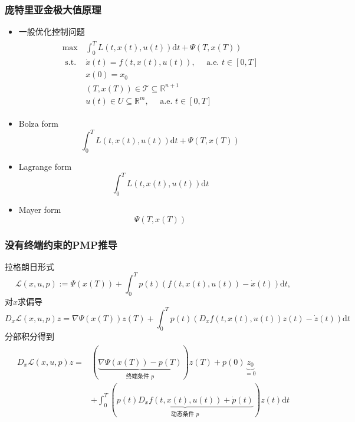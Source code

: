 \documentclass[UTF8, aspectratio=169, 9pt]{ctexbeamer}
\begin{document}
\begin{frame}
  \frametitle{庞特里亚金极大值原理}
  \begin{itemize}
    \item 一般优化控制问题
    \begin{align}
      \begin{split}
\max  \, & \int_{0}^{T} L(t, x(t), u(t)) \mathrm{d} t+\Psi(T, x(T)) \\
 \text { s.t. } & \dot{x}(t)=f(t, x(t), u(t)), \quad \text { a.e. } t \in[0, T] \\
& x(0)=x_{0} \\
& (T, x(T)) \in \mathcal{T} \subseteq \mathbb{R}^{n+1} \\
& u(t) \in U \subseteq \mathbb{R}^{m}, \quad \text { a.e. } t \in[0, T]
\end{split}
    \end{align}
    \item Bolza form
    $$ \int_{0}^{T} L(t, x(t), u(t)) \mathrm{d} t+\Psi(T, x(T)) $$
    \item Lagrange form
    $$ \int_{0}^{T} L(t, x(t), u(t)) \mathrm{d} t
    $$
    \item Mayer form
    $$ \Psi(T, x(T))
    $$ 
  \end{itemize}
\end{frame}

\begin{frame}
\frametitle{没有终端约束的PMP推导 }
拉格朗日形式
$$
  \mathcal{L}(x, u, p):=\Psi(x(T))+\int_{0}^{T} p(t)(f(t, x(t), u(t))-\dot{x}(t)) \mathrm{d} t,
$$
对$x$求偏导
$$
D_{x} \mathcal{L}(x, u, p) z=\nabla \Psi(x(T)) z(T)+\int_{0}^{T} p(t)\left(D_{x} f(t, x(t), u(t)) z(t)-\dot{z}(t)\right) \mathrm{d} t
$$
分部积分得到
\begin{align*}
  \begin{split}
  D_{x} \mathcal{L}(x, u, p) z=&(\underbrace{\nabla \Psi(x(T))-p(T)}_{\text {终端条件 } p}) z(T)+p(0) \underbrace{z_{0}}_{=0} \\
&+\int_{0}^{T}(\underbrace{p(t) D_{x} f(t, x(t), u(t))+\dot{p}(t)}_{\text {动态条件 } p}) z(t) \mathrm{d} t
  \end{split}
\end{align*}
\end{frame}
\end{document}
